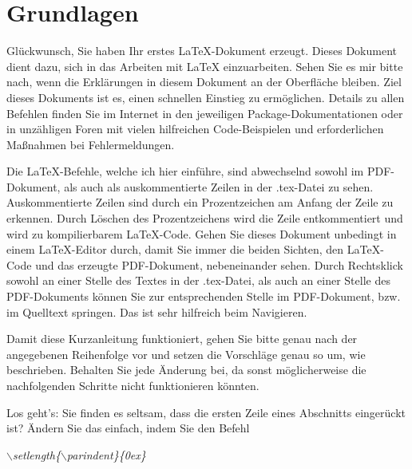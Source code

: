 \documentclass[ngerman]{book}	%
\begin{document}

\chapter{Grundlagen}

Glückwunsch, Sie haben Ihr erstes \LaTeX-Dokument erzeugt. Dieses Dokument dient dazu, sich in das Arbeiten mit \LaTeX\; einzuarbeiten. Sehen Sie es mir bitte nach, wenn die Erklärungen in diesem Dokument an der Oberfläche bleiben. Ziel dieses Dokuments ist es, einen schnellen Einstieg zu ermöglichen. Details zu allen Befehlen finden Sie im Internet in den jeweiligen Package-Dokumentationen oder in unzähligen Foren mit vielen hilfreichen Code-Beispielen und erforderlichen Maßnahmen bei Fehlermeldungen.

Die \LaTeX-Befehle, welche ich hier einführe, sind abwechselnd sowohl im PDF-Dokument, als auch als auskommentierte Zeilen in der .tex-Datei zu sehen. Auskommentierte Zeilen sind durch ein Prozentzeichen am Anfang der Zeile zu erkennen. Durch Löschen des Prozentzeichens wird die Zeile entkommentiert und wird zu kompilierbarem \LaTeX-Code. Gehen Sie dieses Dokument unbedingt in einem \LaTeX-Editor durch, damit Sie immer die beiden Sichten, den \LaTeX-Code und das erzeugte PDF-Dokument, nebeneinander sehen. Durch Rechtsklick sowohl an einer Stelle des Textes in der .tex-Datei, als auch an einer Stelle des PDF-Dokuments können Sie zur entsprechenden Stelle im PDF-Dokument, bzw. im Quelltext springen. Das ist sehr hilfreich beim Navigieren.

Damit diese Kurzanleitung funktioniert, gehen Sie bitte genau nach der angegebenen Reihenfolge vor und setzen die Vorschläge genau so um, wie beschrieben. Behalten Sie jede Änderung bei, da sonst möglicherweise die nachfolgenden Schritte nicht funktionieren könnten.

Los geht's: Sie finden es seltsam, dass die ersten Zeile eines Abschnitts eingerückt ist? Ändern Sie das einfach, indem Sie den Befehl

\textit{$\backslash$setlength\{$\backslash$parindent\}\{0ex\}}
\end{document}
